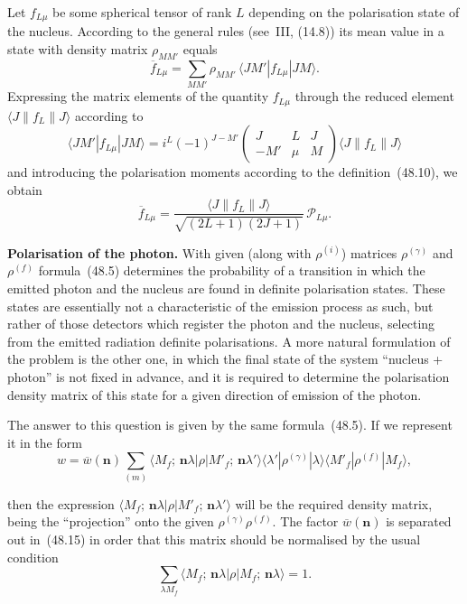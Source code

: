 Let $f_{L\mu}$ be some spherical tensor of rank $L$ depending on the polarisation state of the nucleus. According to the general rules (see~III, (14.8)) its mean value in a state with density matrix $\rho_{MM'}$ equals
\begin{equation}
\overline{f}_{L\mu} = \sum_{MM'}\rho_{MM'}\,\langle JM'|f_{L\mu}|JM\rangle.
\tag{48.13}
\end{equation}
Expressing the matrix elements of the quantity $f_{L\mu}$ through the reduced element $\langle J\|f_L\|J\rangle$ according to
\[
\langle JM'|f_{L\mu}|JM\rangle = i^L(-1)^{J-M'}\begin{pmatrix} J & L & J \\ -M' & \mu & M\end{pmatrix}\langle J\|f_L\|J\rangle
\]
and introducing the polarisation moments according to the definition~(48.10), we obtain
\begin{equation}
\overline{f}_{L\mu} = \frac{\langle J\|f_L\|J\rangle}{\sqrt{(2L+1)(2J+1)}}\,\mathcal{P}_{L\mu}.
\tag{48.14}
\end{equation}

\textbf{Polarisation of the photon.} With given (along with $\rho^{(i)}$) matrices $\rho^{(\gamma)}$ and $\rho^{(f)}$ formula~(48.5) determines the probability of a transition in which the emitted photon and the nucleus are found in definite polarisation states. These states are essentially not a characteristic of the emission process as such, but rather of those detectors which register the photon and the nucleus, selecting from the emitted radiation definite polarisations. A more natural formulation of the problem is the other one, in which the final state of the system ``nucleus + photon'' is not fixed in advance, and it is required to determine the polarisation density matrix of this state for a given direction of emission of the photon.

The answer to this question is given by the same formula~(48.5). If we represent it in the form
\begin{equation}
w = \overline{w}(\mathbf{n})\sum_{(m)}\langle M_f;\,\mathbf{n}\lambda|\rho|M'_f;\,\mathbf{n}\lambda'\rangle\langle\lambda'|\rho^{(\gamma)}|\lambda\rangle\langle M'_f|\rho^{(f)}|M_f\rangle,
\tag{48.15}
\end{equation}

then the expression $\langle M_f;\,\mathbf{n}\lambda|\rho|M'_f;\,\mathbf{n}\lambda'\rangle$ will be the required density matrix, being the ``projection'' onto the given $\rho^{(\gamma)}\rho^{(f)}$. The factor $\overline{w}(\mathbf{n})$ is separated out in~(48.15) in order that this matrix should be normalised by the usual condition
\[
\sum_{\lambda M_f}\langle M_f;\,\mathbf{n}\lambda|\rho|M_f;\,\mathbf{n}\lambda\rangle = 1.
\]

